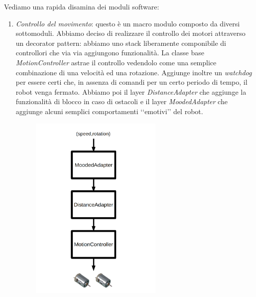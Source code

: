\documentclass[12pt]{article}
\newcommand{\cbegin}{‘‘}
\newcommand{\cend}{’’}
\newcommand{\imgszland}{0.6\textwidth}
\begin{document}
Vediamo una rapida disamina dei moduli software:
\begin{enumerate}
\item \emph{Controllo del movimento}: questo è un macro modulo composto da diversi sottomoduli. Abbiamo deciso di realizzare il controllo dei motori attraverso un decorator pattern: abbiamo uno stack liberamente componibile di controllori che via via aggiungono funzionalità. La classe base \emph{MotionController} astrae il controllo vedendolo come una semplice combinazione di una velocità ed una rotazione. Aggiunge inoltre un \emph{watchdog} per essere certi che, in assenza di comandi per un certo periodo di tempo, il robot venga fermato. Abbiamo poi il layer \emph{DistanceAdapter} che aggiunge la funzionalità di blocco in caso di ostacoli e il layer \emph{MoodedAdapter} che aggiunge alcuni semplici comportamenti \cbegin{}emotivi\cend{} del robot.\\
\begin{figure}[h]
\includegraphics[width=\imgszland]{motion_stack}

\end{figure}
\end{enumerate}
\end{document}
